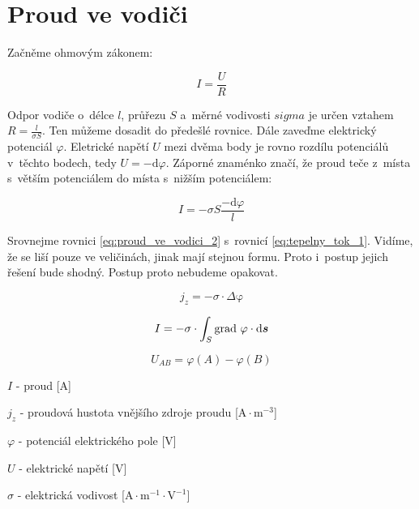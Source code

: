 \section{Proud ve vodiči}

Začněme ohmovým zákonem:

\begin{equation}
\label{eq:proud_ve_vodici_1}
I = \frac{U}{R}
\end{equation}

Odpor vodiče o~délce \(l\), průřezu \(S\) a~měrné vodivosti \(sigma\) je určen vztahem \(R = \frac{l}{\sigma S}\). Ten můžeme dosadit do předešlé rovnice. Dále zaveďme elektrický potenciál \(\varphi\). Eletrické napětí \(U\) mezi dvěma body je rovno rozdílu potenciálů v~těchto bodech, tedy \(U = -\mathrm{d}\varphi\). Záporné znaménko značí, že proud teče z~místa s~větším potenciálem do místa s~nižším potenciálem:

\begin{equation}
\label{eq:proud_ve_vodici_2}
I = -\sigma S \frac{-\mathrm{d}\varphi}{l}
\end{equation}

Srovnejme rovnici \eqref{eq:proud_ve_vodici_2} s~rovnicí \eqref{eq:tepelny_tok_1}. Vidíme, že se liší pouze ve veličinách, jinak mají stejnou formu. Proto i~postup jejich řešení bude shodný. Postup proto nebudeme opakovat.

\begin{fact}
\begin{equation}
j_z = -\sigma \cdot \Delta \mathrm{\varphi}
\end{equation}

\begin{equation}
I = -\sigma \cdot \int_{S} \grad \ \mathrm{\varphi} \cdot \mathrm{d}\vect{s} 
\end{equation}

\begin{equation}
U_{AB} = \varphi(A) - \varphi(B) 
\end{equation}

\(I\) - proud [\(\mathrm{A}\)]

\(j_z\) - proudová hustota vnějšího zdroje proudu [\(\mathrm{A} \cdot \mathrm{m}^{-3}\)]

\(\varphi\) - potenciál elektrického pole [\(\mathrm{V}\)]

\(U\) - elektrické napětí [\(\mathrm{V}\)]

\(\sigma\) - elektrická vodivost [\(\mathrm{A} \cdot \mathrm{m}^{-1} \cdot \mathrm{V}^{-1}\)] 
\end{fact}


